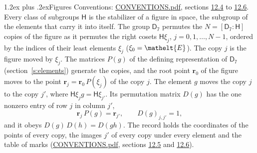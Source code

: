 \documentclass[10pt,a4paper]{article}
\makeatletter
\renewcommand\section{\@startsection{section}{1}{\z@}{-3ex plus -1ex minus -.2ex}%
  {1.2ex plus .2ex}{\normalfont\large\sffamily\bfseries\color{parttitle}}}
\numberwithin{equation}{section}
\newcommand{\eltfont}[1]{{\let\sigma\eltsigma\mathelt{#1}}}
\newcommand{\grp}[1]{\mathsf{#1}}
\newcommand{\cls}[1]{\eltfont{#1}}
\newcommand{\pointr}{\mathbf{r}}
\makeatother
\begin{document}
\section{Figures}\label{s:permutation}
Conventions: \href{../../CONVENTIONS.pdf}{CONVENTIONS.pdf}, sections \href{../../CONVENTIONS.pdf\#conv.12.4}{12.4} to \href{../../CONVENTIONS.pdf\#conv.12.6}{12.6}.
Every class of subgroups $\grp{H}$ is the stabilizer of a figure in space, the subgroup of the elements that carry it into itself. \label{n:local.orbit.size}\label{n:element.coset.least}\label{n:index.coset}The group $\grp{D_{7}}$ permutes the $N = [\grp{D_{7}} : \grp{H}]$ copies of the figure as it permutes the right cosets $\grp{H}\xi_j$, $j = 0, 1, \dots, N - 1$, ordered by the indices of their least elements $\xi_j$ ($\xi_0 = \cls{E}$). The copy $j$ is the figure moved by $\xi_j$. The matrices $P(g)$ of the defining representation of $\grp{D_{7}}$ (section~\ref{s:elements}) generate the copies, and the root point $\pointr_0$ of the figure moves to the point $\pointr_j = \pointr_0\, P(\xi_j)$ of the copy $j$. \label{n:local.coset.image}The element $g$ moves the copy $j$ to the copy $j'$, where $\grp{H}\xi_j g = \grp{H}\xi_{j'}$. \label{n:local.matrix.permutation}Its permutation matrix $D(g)$ has the one nonzero entry of row $j$ in column $j'$,
\begin{equation}\label{e:perm.matrix}\pointr_j\, P(g) = \pointr_{j'}, \qquad D(g)_{j,j'} = 1,\end{equation}
and it obeys $D(g)\, D(h) = D(gh)$. The record holds the coordinates of the points of every copy, the images $j'$ of every copy under every element and the table of marks (\href{../../CONVENTIONS.pdf}{CONVENTIONS.pdf}, sections \href{../../CONVENTIONS.pdf\#conv.12.5}{12.5} and \href{../../CONVENTIONS.pdf\#conv.12.6}{12.6}).
\end{document}
